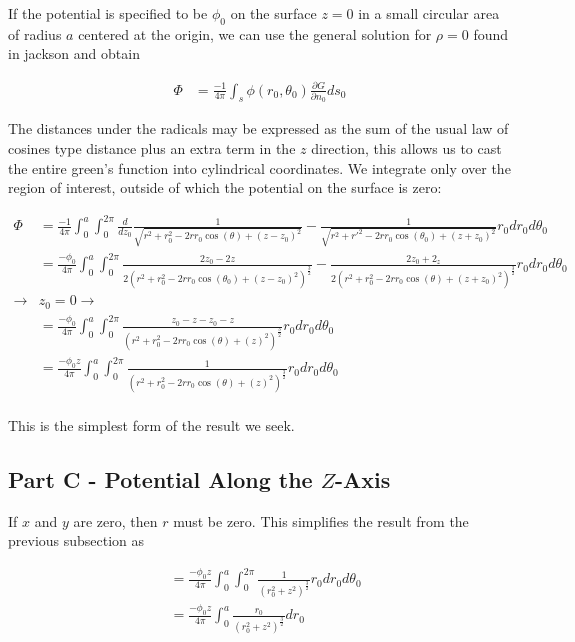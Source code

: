 \documentclass[paper=a4, fontsize=11pt]{scrartcl} %
\numberwithin{equation}{section} %
\numberwithin{figure}{section} %
\numberwithin{table}{section} %
\begin{document}
If the potential is specified to be $\phi_0$ on the surface $z=0$ in a small circular area of radius $a$ centered at the origin, we can use the general solution for $\rho = 0$ found in jackson and obtain 

\begin{align}
\Phi &= \frac{-1}{4 \pi}\int_s \phi(r_0, \theta_0)\frac{\partial G}{\partial n_0}ds_0
\end{align}

The distances under the radicals may be expressed as the sum of the usual law of cosines type distance plus an extra term in the $z$ direction, this allows us to cast the entire green's function into cylindrical coordinates. We integrate only over the region of interest, outside of which the potential on the surface is zero:

\begin{align}
\Phi &= \frac{-1}{4 \pi } \int_0^a \int_0^{2 \pi} \frac{d}{dz_0}\frac{1}{\sqrt{r^2 + r_0^2 - 2 r r_0 \cos(\theta) + (z - z_0)^2}} - \frac{1}{\sqrt{r^2 + r'^2 - 2 r r_0 \cos(\theta_0) + (z + z_0)^2}}r_0dr_0d\theta_0 \\
&= \frac{-\phi_0}{4 \pi } \int_0^a \int_0^{2 \pi} \frac{2z_0 - 2z}{2\left(r^2 + r_0^2 - 2 r r_0 \cos(\theta_0) + (z - z_0)^2\right)^{\frac{3}{2}}} - \frac{2z_0 + 2_z}{2\left(r^2 + r_0^2 - 2 r r_0 \cos(\theta) + (z + z_0)^2\right)^{\frac{3}{2}}}r_0dr_0d\theta_0 \\
\rightarrow & z_0 = 0 \rightarrow \\
&= \frac{-\phi_0}{4 \pi } \int_0^a \int_0^{2 \pi} \frac{z_0 - z - z_0 - z}{\left(r^2 + r_0^2 - 2 r r_0 \cos(\theta) + (z)^2\right)^{\frac{3}{2}}} r_0dr_0d\theta_0 \\
&= \frac{-\phi_0z}{4 \pi } \int_0^a \int_0^{2 \pi} \frac{1}{\left(r^2 + r_0^2 - 2 r r_0 \cos(\theta) + (z)^2\right)^{\frac{3}{2}}} r_0dr_0d\theta_0 \\
\end{align}

This is the simplest form of the result we seek.

\subsection{Part C - Potential Along the $Z$-Axis}

If $x$ and $y$ are zero, then $r$ must be zero. This simplifies the result from the previous subsection as

\begin{align}
&= \frac{-\phi_0z}{4 \pi } \int_0^a \int_0^{2 \pi} \frac{1}{\left(r_0^2 + z^2\right)^{\frac{3}{2}}} r_0dr_0d\theta_0 \\
&= \frac{-\phi_0 z}{4 \pi}\int_0^a \frac{r_0}{(r_0^2 + z^2)^{\frac{3}{2}}}dr_0
\end{align}
\end{document}
